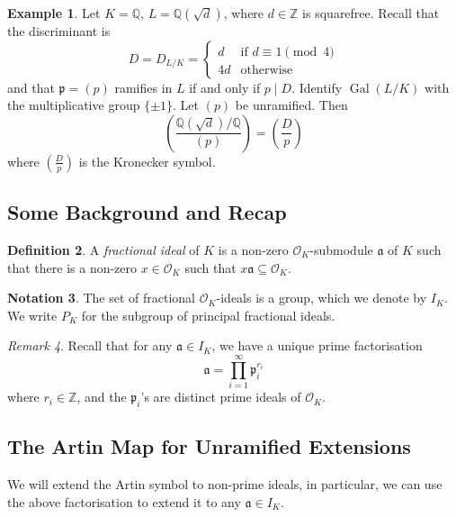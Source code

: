 \documentclass[11pt]{article}
\theoremstyle{definition}
\newtheorem{definition}{Definition}[section]
\newtheorem{example}[definition]{Example}
\newtheorem{notation}[definition]{Notation}
\theoremstyle{plain}
\theoremstyle{remark}
\newtheorem{remark}[definition]{Remark}
\DeclareMathOperator{\Gal}{Gal}
\newcommand{\ZZ}{\mathbb{Z}}
\newcommand{\QQ}{\mathbb{Q}}
\newcommand{\cO}{\mathcal{O}}
\newcommand{\fa}{\mathfrak{a}}
\newcommand{\fp}{\mathfrak{p}}
\newcommand{\leg}[2]{\left(\frac{#1}{#2}\right)}
\begin{document}
\begin{example}\label{eg:1_10}
    Let $K = \QQ$, $L = \QQ(\sqrt{d})$, where $d \in \ZZ$ is squarefree. Recall that the discriminant is
    \begin{equation*}
        D = D_{L/K} =
        \begin{cases}
            d &\text{if } d \equiv 1 \pmod{4}\\
            4d &\text{otherwise}
        \end{cases}
    \end{equation*}
    and that $\fp = (p)$ ramifies in $L$ if and only if $p \mid D$. Identify $\Gal(L/K)$ with the multiplicative group $\{\pm 1\}$. Let $(p)$ be unramified. Then
    \begin{equation*}
        \leg{\QQ(\sqrt{d}) / \QQ}{(p)} = \leg{D}{p}
    \end{equation*}
    where $\leg{D}{p}$ is the Kronecker symbol.
\end{example}


\subsection{Some Background and Recap}

\begin{definition}\label{def:2_1}
    A \emph{fractional ideal} of $K$ is a non-zero $\cO_K$-submodule $\fa$ of $K$ such that there is a non-zero $x \in \cO_K$ such that $x \fa \subseteq \cO_K$.
\end{definition}

\begin{notation}\label{not:2_2}
    The set of fractional $\cO_K$-ideals is a group, which we denote by $I_K$. We write $P_K$ for the subgroup of principal fractional ideals.
\end{notation}

\begin{remark}\label{rem:2_3}
    Recall that for any $\fa \in I_K$, we have a unique prime factorisation
    \begin{equation}\label{eqn:2_3_fact}
        \fa = \prod_{i=1}^\infty \fp_i^{r_i}
    \end{equation}
    where $r_i \in \ZZ$, and the $\fp_i$'s are distinct prime ideals of $\cO_K$.
\end{remark}

\subsection{The Artin Map for Unramified Extensions}
We will extend the Artin symbol to non-prime ideals, in particular, we can use the above factorisation to extend it to any $\fa \in I_K$.
\end{document}
